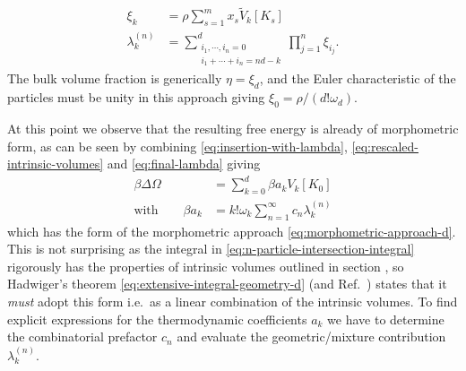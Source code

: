 \documentclass[11pt,twoside]{report}
\begin{document}
\begin{subequations}
  \begin{align}
    \label{eq:spt-variables-resummation}
    \xi_k
    &=
    \rho \sum_{s = 1}^m x_s \widetilde{V}_k[K_s]
    \\
    \label{eq:little-lambda}
    \lambda_k^{(n)}
    &=
    \sum_{\substack{i_1, \cdots, i_n = 0 \\ i_1 + \cdots + i_n = nd - k}}^d
    \prod_{j=1}^n
    \xi_{i_j}.
  \end{align}
\end{subequations}
The bulk volume fraction is generically $\eta = \xi_d$, and the Euler characteristic of the particles must be unity in this approach giving $\xi_0 = \rho / (d! \omega_d)$.

At this point we observe that the resulting free energy is already of morphometric form, as can be seen by combining \eqref{eq:insertion-with-lambda}, \eqref{eq:rescaled-intrinsic-volumes} and \eqref{eq:final-lambda} giving
\begin{subequations}\label{eq:morphometric-approach-from-virial}
  \begin{align}
    \beta \Delta \Omega
    &=
    \sum_{k=0}^d \beta a_k V_k[K_0]
    \\ \textrm{with} \qquad
    \beta a_k
    &=
    k! \omega_k \sum_{n=1}^\infty c_n \lambda_k^{(n)}
    \label{eq:a-coefficient}
  \end{align}
\end{subequations}
which has the form of the morphometric approach \eqref{eq:morphometric-approach-d}.
This is not surprising as the integral in \eqref{eq:n-particle-intersection-integral} rigorously has the properties of intrinsic volumes outlined in section \label{sec:morph-overview}, so Hadwiger's theorem \eqref{eq:extensive-integral-geometry-d} (and Ref.\ \cite{Hadwiger1957}) states that it \emph{must} adopt this form i.e.\ as a linear combination of the intrinsic volumes.
To find explicit expressions for the thermodynamic coefficients $a_k$ we have to determine the combinatorial prefactor $c_n$ and evaluate the geometric/mixture contribution $\lambda_k^{(n)}$.
\end{document}
